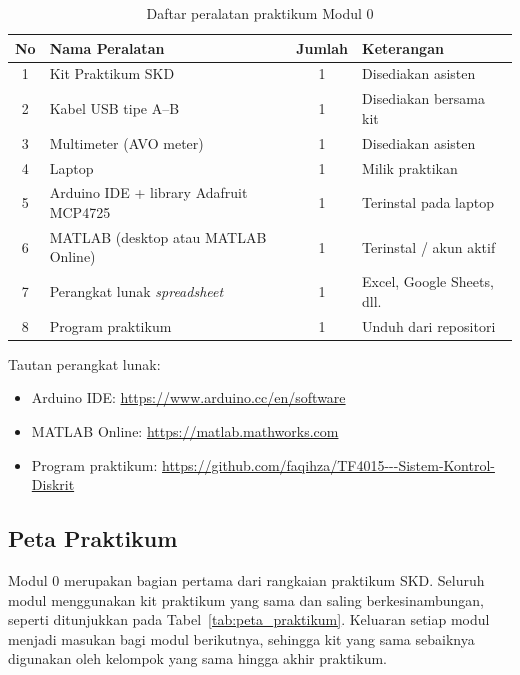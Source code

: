 \documentclass[11pt,a4paper]{article}
\begin{document}
\begin{table}[H]
	\centering
	\caption{Daftar peralatan praktikum Modul 0}
	\label{tab:peralatan_praktikum}
	\begin{tabularx}{\textwidth}{|c|X|c|l|}
		\hline
		\textbf{No} & \textbf{Nama Peralatan}                  & \textbf{Jumlah} & \textbf{Keterangan}          \\
		\hline
		1           & Kit Praktikum SKD                        & 1               & Disediakan asisten           \\
		2           & Kabel USB tipe A--B                      & 1               & Disediakan bersama kit       \\
		3           & Multimeter (AVO meter)                   & 1               & Disediakan asisten           \\
		4           & Laptop                                   & 1               & Milik praktikan              \\
		5           & Arduino IDE + library Adafruit MCP4725   & 1               & Terinstal pada laptop        \\
		6           & MATLAB (desktop atau MATLAB Online)      & 1               & Terinstal / akun aktif       \\
		7           & Perangkat lunak \textit{spreadsheet}     & 1               & Excel, Google Sheets, dll.   \\
		8           & Program praktikum                        & 1               & Unduh dari repositori        \\
		\hline
	\end{tabularx}
\end{table}

Tautan perangkat lunak:
\begin{itemize}
	\item Arduino IDE: \url{https://www.arduino.cc/en/software}
	\item MATLAB Online: \url{https://matlab.mathworks.com}
	\item Program praktikum: \url{https://github.com/faqihza/TF4015---Sistem-Kontrol-Diskrit}
\end{itemize}

\subsection{Peta Praktikum}
Modul 0 merupakan bagian pertama dari rangkaian praktikum SKD. Seluruh modul menggunakan kit praktikum yang sama dan saling berkesinambungan, seperti ditunjukkan pada Tabel~\ref{tab:peta_praktikum}. Keluaran setiap modul menjadi masukan bagi modul berikutnya, sehingga kit yang sama sebaiknya digunakan oleh kelompok yang sama hingga akhir praktikum.
\end{document}
